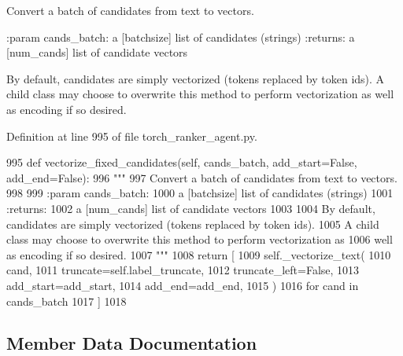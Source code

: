 \begin{DoxyVerb}Convert a batch of candidates from text to vectors.

:param cands_batch:
    a [batchsize] list of candidates (strings)
:returns:
    a [num_cands] list of candidate vectors

By default, candidates are simply vectorized (tokens replaced by token ids).
A child class may choose to overwrite this method to perform vectorization as
well as encoding if so desired.
\end{DoxyVerb}
 

Definition at line 995 of file torch\+\_\+ranker\+\_\+agent.\+py.


\begin{DoxyCode}
995     \textcolor{keyword}{def }vectorize\_fixed\_candidates(self, cands\_batch, add\_start=False, add\_end=False):
996         \textcolor{stringliteral}{"""}
997 \textcolor{stringliteral}{        Convert a batch of candidates from text to vectors.}
998 \textcolor{stringliteral}{}
999 \textcolor{stringliteral}{        :param cands\_batch:}
1000 \textcolor{stringliteral}{            a [batchsize] list of candidates (strings)}
1001 \textcolor{stringliteral}{        :returns:}
1002 \textcolor{stringliteral}{            a [num\_cands] list of candidate vectors}
1003 \textcolor{stringliteral}{}
1004 \textcolor{stringliteral}{        By default, candidates are simply vectorized (tokens replaced by token ids).}
1005 \textcolor{stringliteral}{        A child class may choose to overwrite this method to perform vectorization as}
1006 \textcolor{stringliteral}{        well as encoding if so desired.}
1007 \textcolor{stringliteral}{        """}
1008         \textcolor{keywordflow}{return} [
1009             self.\_vectorize\_text(
1010                 cand,
1011                 truncate=self.label\_truncate,
1012                 truncate\_left=\textcolor{keyword}{False},
1013                 add\_start=add\_start,
1014                 add\_end=add\_end,
1015             )
1016             \textcolor{keywordflow}{for} cand \textcolor{keywordflow}{in} cands\_batch
1017         ]
1018 \end{DoxyCode}


\subsection{Member Data Documentation}
\mbox{\label{classparlai_1_1core_1_1torch__ranker__agent_1_1TorchRankerAgent_af54615af2f53a06df8fb046492f1ec38}} 
